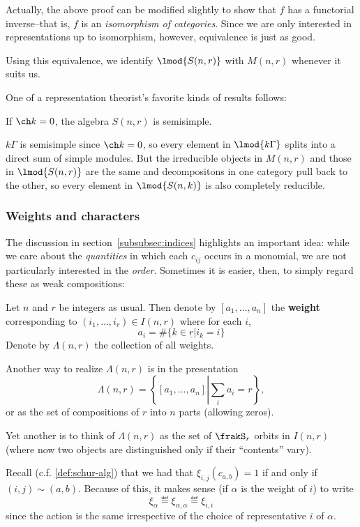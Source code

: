 \documentclass[12pt]{article}
\begin{document}
\begin{rmk}
	Actually, the above proof can be modified slightly to show that $f$ has a functorial inverse--that is, $f$ is an \textit{isomorphism of categories}.
	Since we are only interested in representations up to isomorphism, however, equivalence is just as good.
\end{rmk}
\begin{rmk}
	Using this equivalence, we identify $\lmod{S(n,r)}$ with $M(n,r)$ whenever it suits us.
\end{rmk}

One of a representation theorist's favorite kinds of results follows:
\begin{cor}\label{cor:semisimple}
	If $\ch k=0$, the algebra $S(n,r)$ is semisimple.
\end{cor}
\begin{prf}
	$k\Gamma$ is semisimple since $\ch k=0$, so every element in $\lmod{k\Gamma}$ splits into a direct sum of simple modules. But the irreducible objects in 
	$M(n,r)$ and those in $\lmod{S(n,r)}$ are the same and decompositons in one category pull back to the other, so every element in $\lmod{S(n,k)}$ is also completely reducible.
\end{prf}

\subsubsection{Weights and characters}
The discussion in section~\ref{subsubsec:indices} highlights an important idea: while we care about the \textit{quantities} in which each $c_{ij}$ occurs 
in a monomial, we are not particularly interested in the \textit{order}. Sometimes it is easier, then, to simply regard these as weak compositions:
\begin{defn}
	Let $n$ and $r$ be integers as usual. Then denote by $[a_1,\dots,a_n]$ the \textbf{weight} corresponding to 
	$(i_1,\dots,i_r)\in I(n,r)$ where for each $i$,
	\[a_i=\#\{k\in\underline r| i_k=i\}\]
	Denote by $\Lambda(n,r)$ the collection of all weights. 
\end{defn}
\begin{rmk}
	Another way to realize $\Lambda(n,r)$ is in the presentation 
	\[\Lambda(n,r)=\left\{[a_1,\dots,a_n]\left|\sum_i a_i=r\right.\right\},\]
	or as the set of compositions of $r$ into $n$ parts (allowing zeros).
	
	Yet another is to think of $\Lambda(n,r)$ as the set of $\frakS_r$ orbits in $I(n,r)$ (where now two objects 
	are distinguished only if their ``contents'' vary).
\end{rmk}
Recall (c.f. \ref{def:schur-alg}) that we had that $\xi_{i,j}(c_{a,b})=1$ if and only if $(i,j)\sim(a,b)$. Because of this, it makes sense (if $\alpha$ is the 
weight of $i$) to write 
\[\xi_{\alpha}\eqdef \xi_{\alpha,\alpha}\eqdef \xi_{i,i}\]
since the action is the same irrespective of the choice of representative $i$ of $\alpha.$
\end{document}
